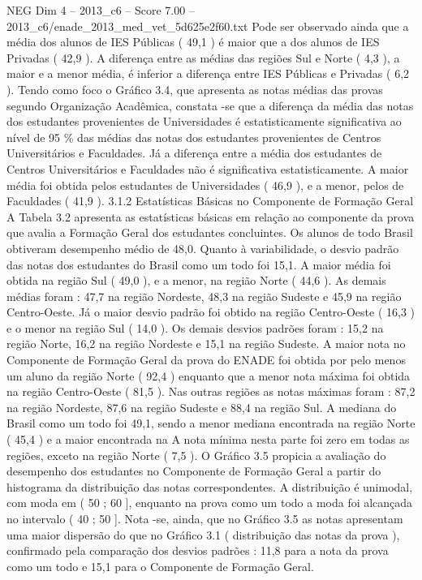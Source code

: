 \begin{textsample}{NEG Dim 4 – 2013\_c6 – Score 7.00 – 2013\_c6/enade\_2013\_med\_vet\_5d625e2f60.txt}
Pode ser observado ainda que a média dos alunos de IES Públicas ( 49,1 ) é maior que a dos alunos de IES Privadas ( 42,9 ).
A diferença entre as médias das regiões Sul e Norte ( 4,3 ), a maior e a menor média, é inferior a diferença entre IES Públicas e Privadas ( 6,2 ).
Tendo como foco o Gráfico 3.4, que apresenta as notas médias das provas segundo Organização Acadêmica, constata -se que a diferença da média das notas dos estudantes provenientes de Universidades é estatisticamente significativa ao nível de 95 \% das médias das notas dos estudantes provenientes de Centros Universitários e Faculdades.
Já a diferença entre a média dos estudantes de Centros Universitários e Faculdades não é significativa estatisticamente.
A maior média foi obtida pelos estudantes de Universidades ( 46,9 ), e a menor, pelos de Faculdades ( 41,9 ). 3.1.2 Estatísticas Básicas no Componente de Formação Geral A Tabela 3.2 apresenta as estatísticas básicas em relação ao componente da prova que avalia a Formação Geral dos estudantes concluintes.
Os alunos de todo Brasil obtiveram desempenho médio de 48,0.
Quanto à variabilidade, o desvio padrão das notas dos estudantes do Brasil como um todo foi 15,1.
A maior média foi obtida na região Sul ( 49,0 ), e a menor, na região Norte ( 44,6 ).
As demais médias foram : 47,7 na região Nordeste, 48,3 na região Sudeste e 45,9 na região Centro-Oeste.
Já o maior desvio padrão foi obtido na região Centro-Oeste ( 16,3 ) e o menor na região Sul ( 14,0 ).
Os demais desvios padrões foram : 15,2 na região Norte, 16,2 na região Nordeste e 15,1 na região Sudeste.
A maior nota no Componente de Formação Geral da prova do ENADE foi obtida por pelo menos um aluno da região Norte ( 92,4 ) enquanto que a menor nota máxima foi obtida na região Centro-Oeste ( 81,5 ).
Nas outras regiões as notas máximas foram : 87,2 na região Nordeste, 87,6 na região Sudeste e 88,4 na região Sul.
A mediana do Brasil como um todo foi 49,1, sendo a menor mediana encontrada na região Norte ( 45,4 ) e a maior encontrada na A nota mínima nesta parte foi zero em todas as regiões, exceto na região Norte ( 7,5 ).
O Gráfico 3.5 propicia a avaliação do desempenho dos estudantes no Componente de Formação Geral a partir do histograma da distribuição das notas correspondentes.
A distribuição é unimodal, com moda em ( 50 ; 60 ], enquanto na prova como um todo a moda foi alcançada no intervalo ( 40 ; 50 ].
Nota -se, ainda, que no Gráfico 3.5 as notas apresentam uma maior dispersão do que no Gráfico 3.1 ( distribuição das notas da prova ), confirmado pela comparação dos desvios padrões : 11,8 para a nota da prova como um todo e 15,1 para o Componente de Formação Geral.

\end{textsample}
